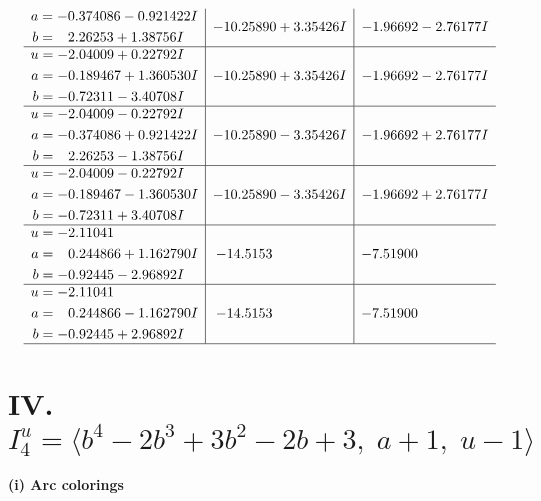 \documentclass[1p]{elsarticle_modified}
\theoremstyle{definition}
\begin{document}
$$\begin{array}{c|c|c}
\begin{aligned}
a &= -0.374086 - 0.921422 I \\
b &= \phantom{-}2.26253 + 1.38756 I\end{aligned}
 & -10.25890 + 3.35426 I & -1.96692 - 2.76177 I \\ \hline\begin{aligned}
u &= -2.04009 + 0.22792 I \\
a &= -0.189467 + 1.360530 I \\
b &= -0.72311 - 3.40708 I\end{aligned}
 & -10.25890 + 3.35426 I & -1.96692 - 2.76177 I \\ \hline\begin{aligned}
u &= -2.04009 - 0.22792 I \\
a &= -0.374086 + 0.921422 I \\
b &= \phantom{-}2.26253 - 1.38756 I\end{aligned}
 & -10.25890 - 3.35426 I & -1.96692 + 2.76177 I \\ \hline\begin{aligned}
u &= -2.04009 - 0.22792 I \\
a &= -0.189467 - 1.360530 I \\
b &= -0.72311 + 3.40708 I\end{aligned}
 & -10.25890 - 3.35426 I & -1.96692 + 2.76177 I \\ \hline\begin{aligned}
u &= -2.11041\phantom{ +0.000000I} \\
a &= \phantom{-}0.244866 + 1.162790 I \\
b &= -0.92445 - 2.96892 I\end{aligned}
 & -14.5153\phantom{ +0.000000I} & -7.51900\phantom{ +0.000000I} \\ \hline\begin{aligned}
u &= -2.11041\phantom{ +0.000000I} \\
a &= \phantom{-}0.244866 - 1.162790 I \\
b &= -0.92445 + 2.96892 I\end{aligned}
 & -14.5153\phantom{ +0.000000I} & -7.51900\phantom{ +0.000000I}\\
 \hline 
 \end{array}$$\newpage\newpage\renewcommand{\arraystretch}{1}
\centering \section*{IV. $I^u_{4}= \langle b^4-2 b^3+3 b^2-2 b+3,\;a+1,\;u-1 \rangle$}
\flushleft \textbf{(i) Arc colorings}\\
\end{document}
